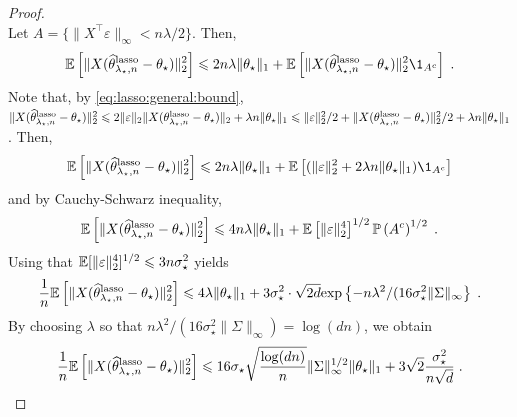 \begin{proof}
$$$$
Let $A = \{\|X^\top\varepsilon\|_\infty < n\lambda / 2\}$. Then,
\begin{align*}
\bE\left[\|X(\widehat\param^{\mathrm{lasso}}_{\lambda_\star,n}-\param_\star)\|_2^2\right] \leqslant 2 n \lambda \|\param_\star\|_1 + \bE\left[\|X(\widehat\param^{\mathrm{lasso}}_{\lambda_\star,n}-\param_\star)\|_2^2 \1_{A^c}\right]\eqsp.
\end{align*}
Note that, by \eqref{eq:lasso:general:bound}, $\|X(\widehat{\theta}^{\mathrm{lasso}}_{\lambda_\star,n}-\theta_\star)\|_2^2 \leqslant 2 \|\varepsilon \|_2 \|X(\theta^{\mathrm{lasso}}_{\lambda_\star,n}-\theta_\star)\|_2 + \lambda n \|\theta_\star\|_1 \leqslant  \|\varepsilon \|_2^2/2 +  \|X(\theta^{\mathrm{lasso}}_{\lambda_\star,n}-\theta_\star)\|_2^2/2 + \lambda n \|\theta_\star\|_1$. Then,
$$
\bE\left[\|X(\widehat\param^{\mathrm{lasso}}_{\lambda_\star,n}-\param_\star)\|_2^2\right] \leqslant 2 n \lambda \|\param_\star\|_1 + \bE\left[ (\|\varepsilon \|_2^2 + 2\lambda n \|\param_\star\|_1) \1_{A^c}\right]
$$
and by Cauchy-Schwarz inequality,
$$
\mathbb{E}\left[\|X(\widehat{\theta}^{\mathrm{lasso}}_{\lambda_\star,n}-\theta_\star)\|_2^2\right] \leqslant 4 n \lambda \|\theta_\star\|_1 + \mathbb{E}\left[\|\varepsilon \|_2^4\right]^{1/2} \mathbb{P}\left(A^c\right)^{1/2}\;.
$$
Using that $\mathbb{E}[\|\varepsilon \|_2^4]^{1/2}\leqslant 3n\sigma_\star^2$ yields
$$
\frac{1}{n}\mathbb{E}\left[\|X(\widehat{\theta}^{\mathrm{lasso}}_{\lambda_\star,n}-\theta_\star)\|_2^2\right] \leqslant  4\lambda \|\theta_\star\|_1  + 3\sigma_\star^2 \cdot \sqrt{2 d}\mathrm{exp}\left\{-n\lambda^2/(16\sigma_\star^2  \|\Sigma\|_\infty\right\}\;.
$$
By choosing $\lambda$ so that $n\lambda^2/(16\sigma_\star^2  \|\Sigma\|_\infty) = \log(dn)$, we obtain
$$
\frac{1}{n}\mathbb{E}\left[\|X(\widehat{\theta}^{\mathrm{lasso}}_{\lambda_\star,n}-\theta_\star)\|_2^2\right] \leqslant  16\sigma_\star\sqrt{\frac{\log(dn)}{n}}\|\Sigma\|_\infty^{1/2}\|\theta_\star\|_1  + 3\sqrt{2}\frac{\sigma_\star^2}{n\sqrt{d}} \;.
$$
\end{proof}


